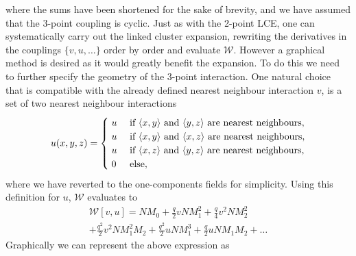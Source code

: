 %
where the sums have been shortened for the sake of brevity, and we have assumed
that the 3-point coupling is cyclic. Just as with the 2-point LCE, one can
systematically carry out the linked cluster expansion, rewriting the derivatives
in the couplings $\{v, u, \dots\}$ order by order and evaluate $\mathcal{W}$.
However a graphical method is desired as it would greatly benefit the
expansion. To do this we need to further specify the geometry of the 3-point
interaction. One natural choice that is compatible with the already defined
nearest neighbour interaction $v$, is a set of two nearest neighbour
interactions
%
\begin{equation} \label{eq:udef_wedge}
  u(x,y,z) = 
    \begin{cases}
      \hskip .1cm u & \text{ if $\langle x, y \rangle$ and $\langle y, z \rangle$ are nearest neighbours},\\
      \hskip .1cm u & \text{ if $\langle x, y \rangle$ and $\langle x, z \rangle$ are nearest neighbours},\\
      \hskip .1cm u & \text{ if $\langle x, z \rangle$ and $\langle y, z \rangle$ are nearest neighbours},\\
      \hskip .1cm 0 & \text{ else},
    \end{cases}
\end{equation}
%
where we have reverted to the one-components fields for simplicity. Using this
definition for $u$, $\mathcal{W}$ evaluates to 
%
\begin{multline}
  \mathcal{W}[v,u] = N M_0 + \frac{q}{2} v N M_1^2 + \frac{q}{4} v^2 N M_2^2 \\
    + \frac{q^2}{2} v^2 N M_1^2 M_2 + \frac{q^2}{2} u N M_1^3 + \frac{q}{2} u N
    M_1 M_2 + \dots
\end{multline}
%
Graphically we can represent the above expression as
%
